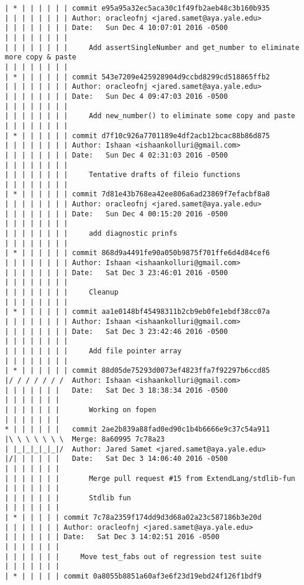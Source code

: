 \begin{lstlisting}
| * | | | | | | commit e95a95a32ec5aca30c1f49fb2aeb48c3b160b935
| | | | | | | | Author: oracleofnj <jared.samet@aya.yale.edu>
| | | | | | | | Date:   Sun Dec 4 10:07:01 2016 -0500
| | | | | | | | 
| | | | | | | |     Add assertSingleNumber and get_number to eliminate more copy & paste
| | | | | | | |         
| * | | | | | | commit 543e7209e425928904d9ccbd8299cd518865ffb2
| | | | | | | | Author: oracleofnj <jared.samet@aya.yale.edu>
| | | | | | | | Date:   Sun Dec 4 09:47:03 2016 -0500
| | | | | | | | 
| | | | | | | |     Add new_number() to eliminate some copy and paste
| | | | | | | |         
| * | | | | | | commit d7f10c926a7701189e4df2acb12bcac88b86d875
| | | | | | | | Author: Ishaan <ishaankolluri@gmail.com>
| | | | | | | | Date:   Sun Dec 4 02:31:03 2016 -0500
| | | | | | | | 
| | | | | | | |     Tentative drafts of fileio functions
| | | | | | | |         
| * | | | | | | commit 7d81e43b768ea42ee806a6ad23869f7efacbf8a8
| | | | | | | | Author: oracleofnj <jared.samet@aya.yale.edu>
| | | | | | | | Date:   Sun Dec 4 00:15:20 2016 -0500
| | | | | | | | 
| | | | | | | |     add diagnostic prinfs
| | | | | | | |         
| * | | | | | | commit 868d9a4491fe90a050b9875f701ffe6d4d84cef6
| | | | | | | | Author: Ishaan <ishaankolluri@gmail.com>
| | | | | | | | Date:   Sat Dec 3 23:46:01 2016 -0500
| | | | | | | | 
| | | | | | | |     Cleanup
| | | | | | | |         
| * | | | | | | commit aa1e0148bf45498311b2cb9eb0fe1ebdf38cc07a
| | | | | | | | Author: Ishaan <ishaankolluri@gmail.com>
| | | | | | | | Date:   Sat Dec 3 23:42:46 2016 -0500
| | | | | | | | 
| | | | | | | |     Add file pointer array
| | | | | | | |         
| * | | | | | | commit 88d05de75293d0073ef4823ffa7f92297b6ccd85
|/ / / / / / /  Author: Ishaan <ishaankolluri@gmail.com>
| | | | | | |   Date:   Sat Dec 3 18:38:34 2016 -0500
| | | | | | |   
| | | | | | |       Working on fopen
| | | | | | |          
* | | | | | |   commit 2ae2b839a88fad0ed90c1b4b6666e9c37c54a911
|\ \ \ \ \ \ \  Merge: 8a60995 7c78a23
| |_|_|_|_|_|/  Author: Jared Samet <jared.samet@aya.yale.edu>
|/| | | | | |   Date:   Sat Dec 3 14:06:40 2016 -0500
| | | | | | |   
| | | | | | |       Merge pull request #15 from ExtendLang/stdlib-fun
| | | | | | |       
| | | | | | |       Stdlib fun
| | | | | | |        
| * | | | | | commit 7c78a2359f174dd9d3d68a02a23c587186b3e20d
| | | | | | | Author: oracleofnj <jared.samet@aya.yale.edu>
| | | | | | | Date:   Sat Dec 3 14:02:51 2016 -0500
| | | | | | | 
| | | | | | |     Move test_fabs out of regression test suite
| | | | | | |        
| * | | | | | commit 0a8055b8851a60af3e6f23d19ebd24f126f1bdf9

\end{lstlisting}
